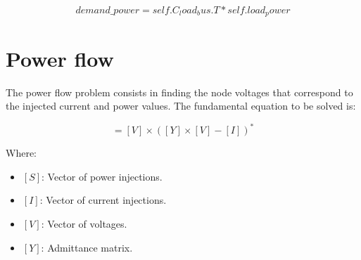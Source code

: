 \documentclass[nols,a4paper,twoside,notoc,fleqn]{tufte-book}
\begin{document}
%
%
%

\begin{equation}
demand\_power = self.C_load_bus.T * self.load_power
\end{equation}
\chapter{Power flow} \label{ch:power_flow}

The power flow problem consists in finding the node voltages that correspond to the injected current and power values. The fundamental equation to be solved is:

\begin{equation}
[S] = [V] \times \left([Y] \times [V] - [I] \right)^*
\label{eq:power_flow}
\end{equation}


Where:

\begin{itemize}
\item $[S]$: Vector of power injections.
\item $[I]$: Vector of current injections.
\item $[V]$: Vector of voltages.
\item $[Y]$: Admittance matrix.
\end{itemize}
\end{document}
